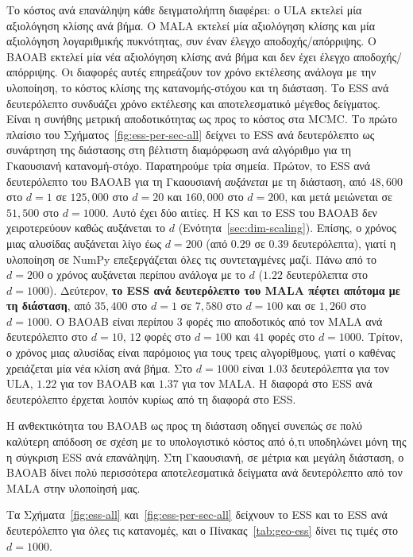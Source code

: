 Το κόστος ανά επανάληψη κάθε δειγματολήπτη διαφέρει: ο ULA εκτελεί μία
αξιολόγηση κλίσης ανά βήμα. Ο MALA εκτελεί μία αξιολόγηση κλίσης και μία
αξιολόγηση λογαριθμικής πυκνότητας, συν έναν έλεγχο αποδοχής/απόρριψης. Ο
BAOAB εκτελεί μία νέα αξιολόγηση κλίσης ανά βήμα και δεν έχει έλεγχο
αποδοχής/απόρριψης. Οι διαφορές αυτές επηρεάζουν τον χρόνο εκτέλεσης ανάλογα με
την υλοποίηση, το κόστος κλίσης της κατανομής-στόχου και τη διάσταση. Το ESS ανά
δευτερόλεπτο συνδυάζει χρόνο εκτέλεσης και αποτελεσματικό μέγεθος δείγματος.
Είναι η συνήθης μετρική αποδοτικότητας ως προς το κόστος στα
MCMC. Το πρώτο πλαίσιο του Σχήματος~\ref{fig:ess-per-sec-all} δείχνει το ESS ανά
δευτερόλεπτο ως συνάρτηση της διάστασης στη βέλτιστη διαμόρφωση ανά αλγόριθμο για
τη Γκαουσιανή κατανομή-στόχο. Παρατηρούμε τρία σημεία.
Πρώτον, το ESS ανά δευτερόλεπτο του BAOAB για τη Γκαουσιανή \emph{αυξάνεται}
με τη διάσταση, από $48{,}600$ στο $d=1$ σε $125{,}000$ στο $d=20$ και $160{,}000$ στο
$d=200$, και μετά μειώνεται σε $51{,}500$ στο $d=1000$. Αυτό έχει δύο αιτίες. Η KS και
το ESS του BAOAB δεν χειροτερεύουν καθώς αυξάνεται το $d$
(Ενότητα~\ref{sec:dim-scaling}). Επίσης, ο χρόνος μιας αλυσίδας αυξάνεται λίγο έως
$d=200$ (από $0.29$ σε $0.39$ δευτερόλεπτα), γιατί η υλοποίηση σε NumPy επεξεργάζεται
όλες τις συντεταγμένες μαζί. Πάνω από το $d=200$ ο χρόνος αυξάνεται περίπου
ανάλογα με το $d$ ($1.22$ δευτερόλεπτα στο $d=1000$).
Δεύτερον, \textbf{το ESS ανά δευτερόλεπτο του MALA πέφτει απότομα με τη
διάσταση}, από $35{,}400$ στο $d=1$ σε $7{,}580$ στο $d=100$ και σε $1{,}260$ στο
$d=1000$. Ο BAOAB είναι περίπου $3$ φορές πιο αποδοτικός από τον MALA ανά
δευτερόλεπτο στο $d=10$, $12$ φορές στο $d=100$ και $41$ φορές στο $d=1000$.
Τρίτον, ο χρόνος μιας αλυσίδας είναι παρόμοιος για τους τρεις αλγορίθμους, γιατί ο
καθένας χρειάζεται μία νέα κλίση ανά βήμα. Στο $d=1000$ είναι $1.03$ δευτερόλεπτα για
τον ULA, $1.22$ για τον BAOAB και $1.37$ για τον MALA. Η διαφορά στο ESS ανά
δευτερόλεπτο έρχεται λοιπόν κυρίως από τη διαφορά στο ESS.

Η ανθεκτικότητα του BAOAB ως προς τη διάσταση οδηγεί συνεπώς σε πολύ καλύτερη
απόδοση σε σχέση με το υπολογιστικό κόστος από ό,τι υποδηλώνει μόνη της η
σύγκριση ESS ανά επανάληψη. Στη Γκαουσιανή, σε μέτρια και μεγάλη διάσταση,
ο BAOAB δίνει πολύ περισσότερα αποτελεσματικά δείγματα ανά δευτερόλεπτο από τον
MALA στην υλοποίησή μας.



Τα Σχήματα~\ref{fig:ess-all} και~\ref{fig:ess-per-sec-all} δείχνουν το ESS και το
ESS ανά δευτερόλεπτο για όλες τις κατανομές, και ο Πίνακας~\ref{tab:geo-ess} δίνει
τις τιμές στο $d=1000$.

